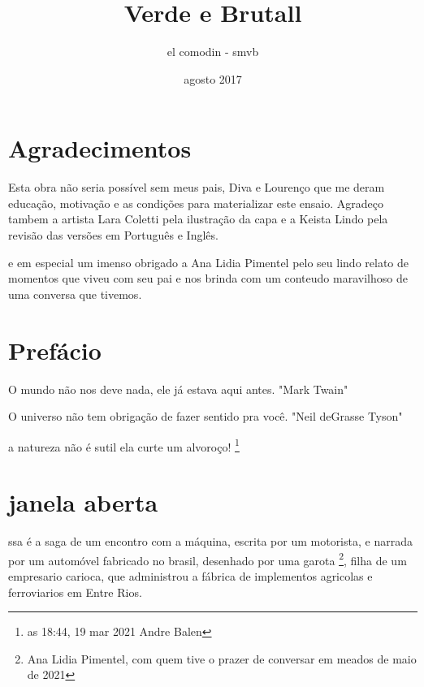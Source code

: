 \documentclass[a4paper]{report}
\title{Verde e Brutall}
\author{el comodin - smvb}
\date{agosto 2017}
\begin{document}
 
\maketitle
 
\tableofcontents

\clearpage

\section*{Agradecimentos}

Esta obra n\~ao seria poss\'ivel sem meus pais, Diva e Louren\c{c}o que me deram educa\c{c}\~ao, motiva\c{c}\~ao e as condi\c{c}\~oes para materializar este ensaio.
Agrade\c{c}o tambem a artista Lara Coletti pela ilustra\c{c}\~ao da capa e a Keista Lindo pela revis\~ao das vers\~oes em Portugu\^es e Ingl\^es.

e em especial um imenso obrigado a Ana Lidia Pimentel pelo seu lindo relato de momentos que viveu com seu pai e nos brinda com um conteudo maravilhoso de uma conversa que tivemos.  



\clearpage

\section*{Pref\'acio}


O mundo n\~ao nos deve nada, ele j\'a estava aqui antes. "Mark Twain"

O universo n\~ao tem obriga\c{c}\~ao de fazer sentido pra voc\^e. "Neil deGrasse Tyson"



a natureza n\~ao \'e sutil
ela curte um alvoro\c{c}o! \footnote{ as 18:44, 19 mar 2021 Andre Balen } 


\clearpage


\section*{janela aberta}

\lettrine[findent=2pt]{}{ }ssa \'e a saga de um encontro com a m\'aquina, escrita por um motorista, e narrada por um autom\'ovel 
fabricado no brasil, desenhado por uma garota \footnote{Ana Lidia Pimentel, com quem tive o prazer de conversar em meados de maio de 2021}, filha de um empresario carioca, que administrou a f\'abrica de
 implementos agricolas e ferroviarios em Entre Rios.
\end{document}
